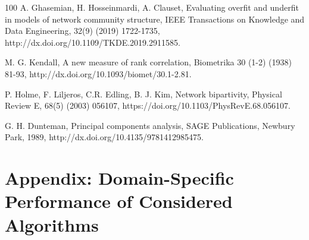 \documentclass{article}
\begin{document}
\begin{thebibliography}{100}
	A. Ghasemian, H. Hosseinmardi, A. Clauset, Evaluating overfit and underfit in models of network community structure, IEEE Transactions on Knowledge and Data Engineering, 32(9) (2019) 1722-1735, http://dx.doi.org/10.1109/TKDE.2019.2911585.
	
	M. G. Kendall, A new measure of rank correlation, Biometrika 30 (1-2) (1938) 81-93, http://dx.doi.org/10.1093/biomet/30.1-2.81.
	
	P. Holme, F. Liljeros, C.R. Edling, B. J. Kim, Network bipartivity, Physical Review E, 68(5) (2003) 056107, https://doi.org/10.1103/PhysRevE.68.056107.
	
	G. H. Dunteman, Principal components analysis, SAGE Publications, Newbury Park, 1989, http://dx.doi.org/10.4135/9781412985475.
	
\end{thebibliography}

\newpage

\section*{Appendix: Domain-Specific Performance of Considered Algorithms}
\small
\setlength{\tabcolsep}{3pt} 
\setlength{\extrarowheight}{1pt} 
\end{document}
